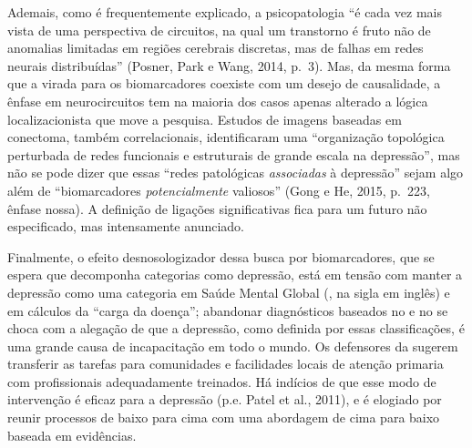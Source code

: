 Ademais, como é frequentemente explicado, a psicopatologia ``é cada vez
mais vista de uma perspectiva de circuitos, na qual um transtorno é
fruto não de anomalias limitadas em regiões cerebrais discretas, mas de
falhas em redes neurais distribuídas'' (Posner, Park e Wang, 2014, p.~3).
Mas, da mesma forma que a virada para os biomarcadores coexiste com um
desejo de causalidade, a ênfase em neurocircuitos tem na maioria dos
casos apenas alterado a lógica localizacionista que move a pesquisa.
Estudos de imagens baseadas em conectoma, também correlacionais,
identificaram uma ``organização topológica perturbada de redes
funcionais e estruturais de grande escala na depressão'', mas não se
pode dizer que essas ``redes patológicas \emph{associadas} à depressão''
sejam algo além de ``biomarcadores \emph{potencialmente} valiosos''
(Gong e He, 2015, p.~223, ênfase nossa). A definição de ligações
significativas fica para um futuro não especificado, mas intensamente
anunciado.

Finalmente, o efeito desnosologizador dessa busca por biomarcadores, que
se espera que decomponha categorias como depressão, está em tensão com
manter a depressão como uma categoria em Saúde Mental Global (, na
sigla em inglês) e em cálculos da ``carga da doença''; abandonar
diagnósticos baseados no \emph{} e no \emph{} se choca com a
alegação de que a depressão, como definida por essas classificações, é
uma grande causa de incapacitação em todo o mundo. Os defensores da 
sugerem transferir as tarefas para comunidades e facilidades locais de
atenção primaria com profissionais adequadamente treinados. Há indícios
de que esse modo de intervenção é eficaz para a depressão (p.e. Patel et
al., 2011), e é elogiado por reunir processos de baixo para cima com uma
abordagem de cima para baixo baseada em evidências.


